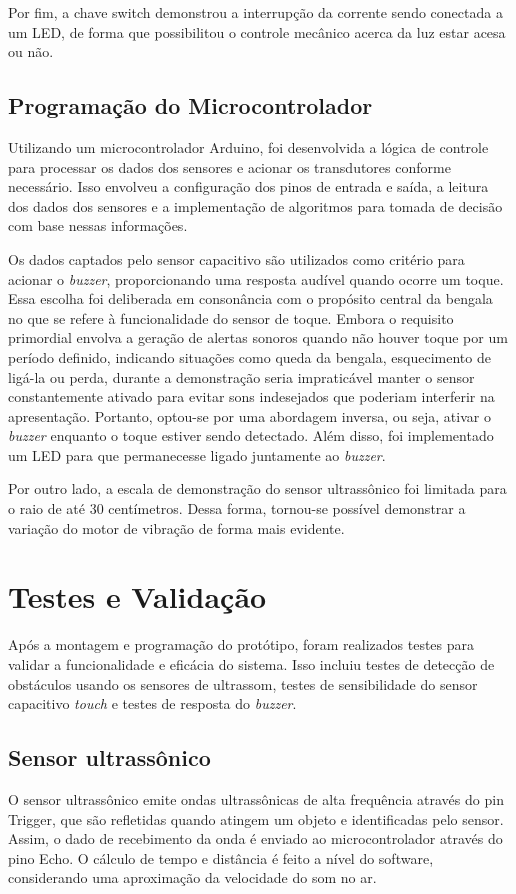 Por fim, a chave switch demonstrou a interrupção da corrente sendo conectada a um LED, de forma que possibilitou o controle mecânico acerca da luz estar acesa ou não. 


\subsection{Programação do Microcontrolador}

Utilizando um microcontrolador Arduino, foi desenvolvida a lógica de controle para processar os dados dos sensores e acionar os transdutores conforme necessário. Isso envolveu a configuração dos pinos de entrada e saída, a leitura dos dados dos sensores e a implementação de algoritmos para tomada de decisão com base nessas informações.

Os dados captados pelo sensor capacitivo são utilizados como critério para acionar o \textit{buzzer}, proporcionando uma resposta audível quando ocorre um toque. Essa escolha foi deliberada em consonância com o propósito central da bengala no que se refere à funcionalidade do sensor de toque. Embora o requisito primordial envolva a geração de alertas sonoros quando não houver toque por um período definido, indicando situações como queda da bengala, esquecimento de ligá-la ou perda, durante a demonstração seria impraticável manter o sensor constantemente ativado para evitar sons indesejados que poderiam interferir na apresentação. Portanto, optou-se por uma abordagem inversa, ou seja, ativar o \textit{buzzer} enquanto o toque estiver sendo detectado. Além disso, foi implementado um LED para que permanecesse ligado juntamente ao \textit{buzzer}.

Por outro lado, a escala de demonstração do sensor ultrassônico foi limitada para o raio de até 30 centímetros. Dessa forma, tornou-se possível demonstrar a variação do motor de vibração de forma mais evidente.

\section{Testes e Validação}

Após a montagem e programação do protótipo, foram realizados testes para validar a funcionalidade e eficácia do sistema. Isso incluiu testes de detecção de obstáculos usando os sensores de ultrassom, testes de sensibilidade do sensor capacitivo \textit{touch} e testes de resposta do \textit{buzzer}.

\subsection{Sensor ultrassônico}
O sensor ultrassônico emite ondas ultrassônicas de alta frequência através do pin Trigger, que são refletidas quando atingem um objeto e identificadas pelo sensor. Assim, o dado de recebimento da onda é enviado ao microcontrolador através do pino Echo. O cálculo de tempo e distância é feito a nível do software, considerando uma aproximação da velocidade do som no ar.

